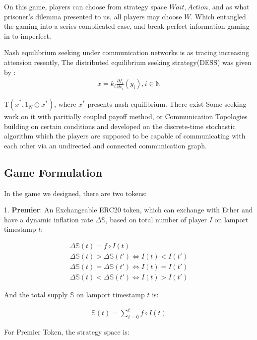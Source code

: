 \documentclass[twocolumn]{article}
\begin{document}
On this game, players can choose from strategy space ${Wait, Action}$, and as what prisoner's dilemma presented to us, all players may choose $W$. Which entangled the gaming into a series complicated case, and break perfect information gaming in to imperfect.


 Nash equilibrium seeking under communication networks is as tracing increasing attension resently, The distributed equilibrium seeking strategy(DESS) was given by \cite{7888532}:
\begin{gather}
  \dot{x} = k_i \frac {\partial f_i}{\partial x_i}(y_i), i \in \mathbb{N}
\end{gather}

T$(\dot{x}^*, 1_N\oplus x^*)$, where $x^*$ presents nash equilibrium. There exist Some seeking work on it with paritially coupled payoff method\cite{8029164}, or Communication Topologies\cite{8093754} building on certain conditions and developed on the discrete-time stochastic algorithm\cite{928588} which the players are supposed to be capable of communicating with each other via an undirected and connected communication graph\cite{7888532}. 

\subsection{Game Formulation}
In the game we designed, there are two tokens:

1. {\bfseries Premier}: An Exchangeable ERC20 token, which can exchange with Ether and have a dynamic inflation rate $\Delta \mathbb{S}$, based on total number of player $I$ on lamport timestamp $t$:

\begin{gather}
  \Delta \mathbb{S}(t) = f \circ I (t) \\
  \Delta \mathbb{S}(t) > \Delta \mathbb{S}(t') \iff I(t) < I(t')\\
  \Delta \mathbb{S}(t) = \Delta \mathbb{S}(t') \iff I(t) = I(t')\\
  \Delta \mathbb{S}(t) < \Delta \mathbb{S}(t') \iff I(t) > I(t')
\end{gather}

And the total supply $\mathbb{S}$ on lamport timestamp $t$ is:

\begin{gather}
  \mathbb{S}(t) = \sum_{i=0}^t f \circ I(t)
\end{gather}

For Premier Token, the strategy space is:
\end{document}
